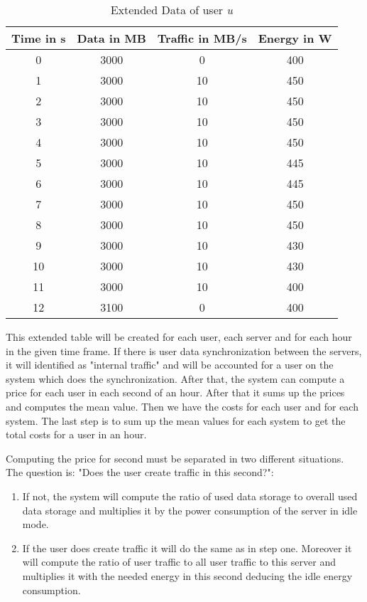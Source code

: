  
 \begin{table}
 \centering
 \caption{Extended Data of user \textit{u}}
 \begin{tabular}{|c|c|c|c|}
  \hline Time in s & Data in MB & Traffic in MB/s & Energy in W \\ 
   \hline 0 & 3000 & 0 & 400 \\ 
  \hline 1 & 3000 & 10 & 450 \\ 
  \hline 2 & 3000 & 10 & 450 \\ 
  \hline 3 & 3000 & 10 & 450\\ 
  \hline 4 & 3000 & 10 & 450 \\ 
  \hline 5 & 3000 & 10 & 445 \\
  \hline 6 & 3000 & 10 & 445 \\ 
  \hline 7 & 3000 & 10 & 450\\ 
  \hline 8 & 3000 & 10 & 450 \\ 
  \hline 9 & 3000 & 10 & 430 \\  
  \hline 10 & 3000 & 10 & 430 \\
   \hline 11 & 3000 & 10 & 400 \\
  \hline 12 & 3100 & 0 & 400 \\  
  \hline 
  \end{tabular}
  \label{tb2} 
  \end{table}
  
  This extended table will be created for each user, each server and for each hour in the given time frame. If there is user data synchronization between the servers, it will identified as "internal traffic" and will be accounted for a user on the system which does the synchronization. After that, the system can compute a price for each user in each second of an hour. After that it sums up the prices and computes the mean value. Then we have the costs for each user and for each system. The last step is to sum up the mean values for each system to get the total costs for a user in an hour.
  
  Computing the price for second must be separated in two different situations. The question is: "Does the user create traffic in this second?":
  \begin{enumerate}
	\item
	If not, the system will compute the ratio of used data storage to overall used data storage and multiplies it by the power consumption of the server in idle mode.
	\item
	If the user does create traffic it will do the same as in step one. Moreover it will compute the ratio of user traffic to all user traffic to this server and multiplies it with the needed energy in this second deducing the idle energy consumption.
  \end{enumerate}
  
